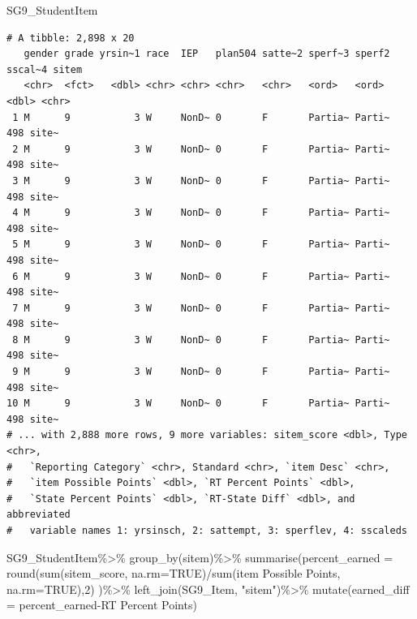 \documentclass[
  letterpaper,
  DIV=11,
  numbers=noendperiod]{scrartcl}
\newenvironment{Shaded}{\begin{snugshade}}{\end{snugshade}}
\newcommand{\AttributeTok}[1]{\textcolor[rgb]{0.40,0.45,0.13}{#1}}
\newcommand{\ConstantTok}[1]{\textcolor[rgb]{0.56,0.35,0.01}{#1}}
\newcommand{\DecValTok}[1]{\textcolor[rgb]{0.68,0.00,0.00}{#1}}
\newcommand{\FunctionTok}[1]{\textcolor[rgb]{0.28,0.35,0.67}{#1}}
\newcommand{\NormalTok}[1]{\textcolor[rgb]{0.00,0.23,0.31}{#1}}
\newcommand{\SpecialCharTok}[1]{\textcolor[rgb]{0.37,0.37,0.37}{#1}}
\newcommand{\StringTok}[1]{\textcolor[rgb]{0.13,0.47,0.30}{#1}}
\begin{document}
\begin{Shaded}
\begin{Highlighting}[]
\NormalTok{SG9\_StudentItem}
\end{Highlighting}
\end{Shaded}

\begin{verbatim}
# A tibble: 2,898 x 20
   gender grade yrsin~1 race  IEP   plan504 satte~2 sperf~3 sperf2 sscal~4 sitem
   <chr>  <fct>   <dbl> <chr> <chr> <chr>   <chr>   <ord>   <ord>    <dbl> <chr>
 1 M      9           3 W     NonD~ 0       F       Partia~ Parti~     498 site~
 2 M      9           3 W     NonD~ 0       F       Partia~ Parti~     498 site~
 3 M      9           3 W     NonD~ 0       F       Partia~ Parti~     498 site~
 4 M      9           3 W     NonD~ 0       F       Partia~ Parti~     498 site~
 5 M      9           3 W     NonD~ 0       F       Partia~ Parti~     498 site~
 6 M      9           3 W     NonD~ 0       F       Partia~ Parti~     498 site~
 7 M      9           3 W     NonD~ 0       F       Partia~ Parti~     498 site~
 8 M      9           3 W     NonD~ 0       F       Partia~ Parti~     498 site~
 9 M      9           3 W     NonD~ 0       F       Partia~ Parti~     498 site~
10 M      9           3 W     NonD~ 0       F       Partia~ Parti~     498 site~
# ... with 2,888 more rows, 9 more variables: sitem_score <dbl>, Type <chr>,
#   `Reporting Category` <chr>, Standard <chr>, `item Desc` <chr>,
#   `item Possible Points` <dbl>, `RT Percent Points` <dbl>,
#   `State Percent Points` <dbl>, `RT-State Diff` <dbl>, and abbreviated
#   variable names 1: yrsinsch, 2: sattempt, 3: sperflev, 4: sscaleds
\end{verbatim}

\begin{Shaded}
\begin{Highlighting}[]
\NormalTok{SG9\_StudentItem}\SpecialCharTok{\%\textgreater{}\%}
   \FunctionTok{group\_by}\NormalTok{(sitem)}\SpecialCharTok{\%\textgreater{}\%}
   \FunctionTok{summarise}\NormalTok{(}\AttributeTok{percent\_earned =} \FunctionTok{round}\NormalTok{(}\FunctionTok{sum}\NormalTok{(sitem\_score, }\AttributeTok{na.rm=}\ConstantTok{TRUE}\NormalTok{)}\SpecialCharTok{/}\FunctionTok{sum}\NormalTok{(}\StringTok{\textasciigrave{}}\AttributeTok{item Possible Points}\StringTok{\textasciigrave{}}\NormalTok{, }\AttributeTok{na.rm=}\ConstantTok{TRUE}\NormalTok{),}\DecValTok{2}\NormalTok{) )}\SpecialCharTok{\%\textgreater{}\%}
   \FunctionTok{left\_join}\NormalTok{(SG9\_Item, }\StringTok{"sitem"}\NormalTok{)}\SpecialCharTok{\%\textgreater{}\%}
   \FunctionTok{mutate}\NormalTok{(}\AttributeTok{earned\_diff =}\NormalTok{ percent\_earned}\SpecialCharTok{{-}}\StringTok{\textasciigrave{}}\AttributeTok{RT Percent Points}\StringTok{\textasciigrave{}}\NormalTok{)}
\end{Highlighting}
\end{Shaded}
\end{document}

